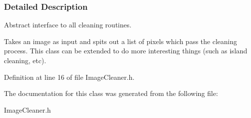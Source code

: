 \subsubsection{Detailed Description}
Abstract interface to all cleaning routines. 

Takes an image as input and spits out a list of pixels which pass the cleaning process. This class can be extended to do more interesting things (such as island cleaning, etc). 

Definition at line 16 of file ImageCleaner.h.



The documentation for this class was generated from the following file:\begin{DoxyCompactItemize}
\item 
ImageCleaner.h\end{DoxyCompactItemize}
